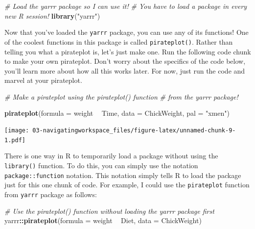 \documentclass[
]{book}
\newenvironment{Shaded}{\begin{snugshade}}{\end{snugshade}}
\newcommand{\CommentTok}[1]{\textcolor[rgb]{0.56,0.35,0.01}{\textit{#1}}}
\newcommand{\DataTypeTok}[1]{\textcolor[rgb]{0.13,0.29,0.53}{#1}}
\newcommand{\KeywordTok}[1]{\textcolor[rgb]{0.13,0.29,0.53}{\textbf{#1}}}
\newcommand{\NormalTok}[1]{#1}
\newcommand{\OperatorTok}[1]{\textcolor[rgb]{0.81,0.36,0.00}{\textbf{#1}}}
\newcommand{\StringTok}[1]{\textcolor[rgb]{0.31,0.60,0.02}{#1}}
\begin{document}
\begin{Shaded}
\begin{Highlighting}[]
\CommentTok{# Load the yarrr package so I can use it!}
\CommentTok{#   You have to load a package in every new R session!}
\KeywordTok{library}\NormalTok{(}\StringTok{"yarrr"}\NormalTok{)}
\end{Highlighting}
\end{Shaded}

Now that you've loaded the \texttt{yarrr} package, you can use any of its functions! One of the coolest functions in this package is called \texttt{pirateplot()}. Rather than telling you what a pirateplot is, let's just make one. Run the following code chunk to make your own pirateplot. Don't worry about the specifics of the code below, you'll learn more about how all this works later. For now, just run the code and marvel at your pirateplot.

\begin{Shaded}
\begin{Highlighting}[]
\CommentTok{# Make a pirateplot using the pirateplot() function}
\CommentTok{#  from the yarrr package!}

\KeywordTok{pirateplot}\NormalTok{(}\DataTypeTok{formula =}\NormalTok{ weight }\OperatorTok{~}\StringTok{ }\NormalTok{Time, }
           \DataTypeTok{data =}\NormalTok{ ChickWeight,}
           \DataTypeTok{pal =} \StringTok{"xmen"}\NormalTok{)}
\end{Highlighting}
\end{Shaded}

\texttt{[image: 03-navigatingworkspace\_files/figure-latex/unnamed-chunk-9-1.pdf]}

There is one way in R to temporarily load a package without using the \texttt{library()} function. To do this, you can simply use the notation \texttt{package::function} notation. This notation simply tells R to load the package just for this one chunk of code. For example, I could use the \texttt{pirateplot} function from \texttt{yarrr} package as follows:

\begin{Shaded}
\begin{Highlighting}[]
\CommentTok{# Use the pirateplot() function without loading the yarrr package first}
\NormalTok{yarrr}\OperatorTok{::}\KeywordTok{pirateplot}\NormalTok{(}\DataTypeTok{formula =}\NormalTok{ weight }\OperatorTok{~}\StringTok{ }\NormalTok{Diet,}
                  \DataTypeTok{data =}\NormalTok{ ChickWeight)}
\end{Highlighting}
\end{Shaded}
\end{document}
